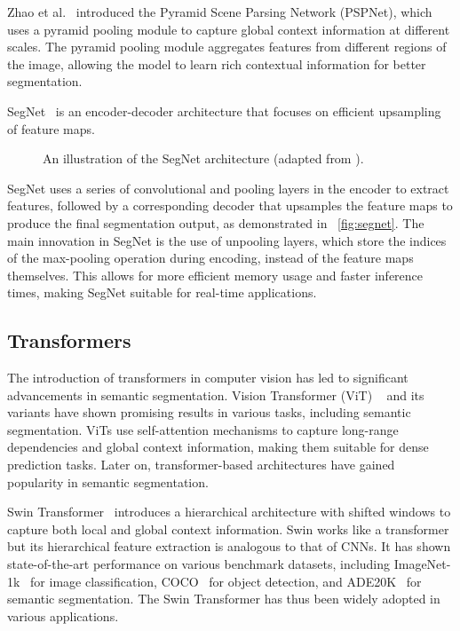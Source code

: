 Zhao et al.~\cite{fsss_pspnet} introduced the Pyramid Scene Parsing Network (PSPNet), which uses a pyramid pooling module to capture global context information at different scales. The pyramid pooling module aggregates features from different regions of the image, allowing the model to learn rich contextual information for better segmentation.

SegNet~\cite{fsss_segnet} is an encoder-decoder architecture that focuses on efficient upsampling of feature maps.
\begin{figure}[htbp]
    \centering
    \caption{An illustration of the SegNet architecture (adapted from \cite{fsss_segnet}).}
    \label{fig:segnet}
\end{figure}

SegNet uses a series of convolutional and pooling layers in the encoder to extract features, followed by a corresponding decoder that upsamples the feature maps to produce the final segmentation output, as demonstrated in ~\autoref{fig:segnet}. The main innovation in SegNet is the use of unpooling layers, which store the indices of the max-pooling operation during encoding, instead of the feature maps themselves. This allows for more efficient memory usage and faster inference times, making SegNet suitable for real-time applications.

\subsection{Transformers}
\label{subsec:transformers}
The introduction of transformers in computer vision has led to significant advancements in semantic segmentation. Vision Transformer (ViT) ~\cite{transformer_vit} and its variants have shown promising results in various tasks, including semantic segmentation. ViTs use self-attention mechanisms to capture long-range dependencies and global context information, making them suitable for dense prediction tasks. Later on, transformer-based architectures have gained popularity in semantic segmentation. 

Swin Transformer~\cite{transformer_swin} introduces a hierarchical architecture with shifted windows to capture both local and global context information. Swin works like a transformer but its hierarchical feature extraction is analogous to that of CNNs. It has shown state-of-the-art performance on various benchmark datasets, including ImageNet-1k~\cite{dataset_imagenet} for image classification, COCO~\cite{dataset_coco} for object detection, and ADE20K~\cite{dataset_ade20k} for semantic segmentation. The Swin Transformer has thus been widely adopted in various applications.

